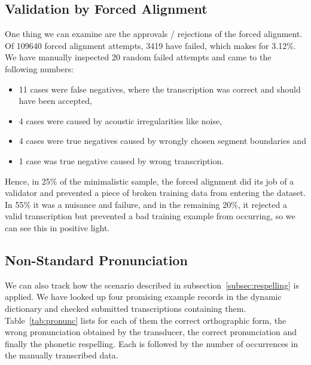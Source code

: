 \documentclass{itatnew}
\begin{document}
\subsection{Validation by Forced Alignment}

One thing we can examine are the approvals / rejections of the forced alignment.
Of 109640 forced alignment attempts, 3419 have failed, which makes for 3.12\%.
We have manually inspected 20 random failed attempts and came to the following
numbers:
\begin{itemize}
\item{
    11 cases were false negatives, where the transcription was correct and
    should have been accepted,
}
\item{
    4 cases were caused by acoustic irregularities like noise,
}
\item{
    4 cases were true negatives caused by wrongly chosen segment boundaries and
}
\item{
    1 case was true negative caused by wrong transcription.
}
\end{itemize}

Hence, in 25\% of the minimalistic sample, the forced alignment did its job of a
validator and prevented a piece of broken training data from entering the
dataset. In 55\% it was a nuisance and failure, and in the remaining 20\%, it
rejected a valid transcription but prevented a bad training example from
occurring, so we can see this in positive light.

\subsection{Non-Standard Pronunciation}

We can also track how the scenario described in
subsection~\ref{subsec:respelling} is applied. We have looked up four promising
example records in the dynamic dictionary and checked submitted transcriptions
containing them. Table~\ref{tab:pronunc} lists for each of them the correct
orthographic form, the wrong pronunciation obtained by the transducer, the
correct pronunciation and finally the phonetic respelling. Each is followed by
the number of occurrences in the manually transcribed data.
\end{document}
